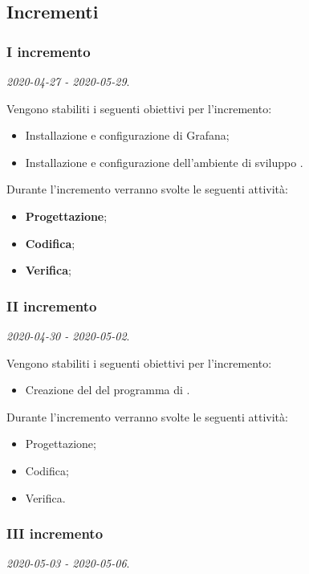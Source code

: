 \documentclass[../piano-di-progetto.tex]{subfiles}
\begin{document}
\subsection{Incrementi}

\subsubsection{I incremento}
\emph{2020-04-27 - 2020-05-29}. 
 
 Vengono stabiliti i seguenti obiettivi per l'incremento:
 \begin{itemize}
     \item Installazione e configurazione di Grafana;
     \item Installazione e configurazione dell'ambiente di sviluppo .
 \end{itemize}

Durante l'incremento verranno svolte le seguenti attività: 
\begin{itemize}
    \item \textbf{Progettazione};
    \item \textbf{Codifica};
    \item \textbf{Verifica};
\end{itemize}

\subsubsection{II incremento}
\emph{2020-04-30 - 2020-05-02}. 
 
 Vengono stabiliti i seguenti obiettivi per l'incremento:
 \begin{itemize}
     \item Creazione del  del programma di .
 \end{itemize}

Durante l'incremento verranno svolte le seguenti attività: 
\begin{itemize}
    \item Progettazione;
    \item Codifica;
    \item Verifica.
\end{itemize}


\subsubsection{III incremento}
\emph{2020-05-03 - 2020-05-06}. 
 
\end{document}
